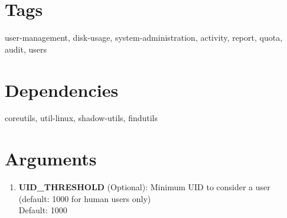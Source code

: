 \documentclass{article}
\begin{document}
\section*{Tags}
user-management, disk-usage, system-administration, activity, report, quota, audit, users

\section*{Dependencies}
coreutils, util-linux, shadow-utils, findutils


\section*{Arguments}
\begin{enumerate}
  \item \textbf{UID\_THRESHOLD} (Optional): Minimum UID to consider a user (default: 1000 for human users only) \\ Default: 1000
\end{enumerate}
\end{document}
